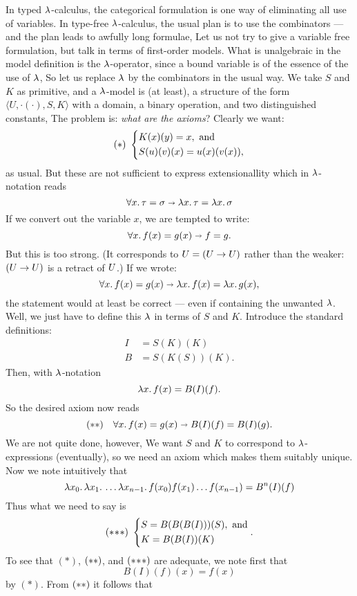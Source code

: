 In typed $\l$-calculus, the categorical formulation is one way of eliminating all use of
variables. In type-free $\l$-calculus, the usual plan is to use the combinators --- and
the plan leads to awfully long formulae, Let us not try to give a variable free
formulation, but talk in terms of first-order models. What is unalgebraic in the model
definition is the $\l$-operator, since a bound variable is of the essence of the use of
$\l$, So let us replace $\l$ by the combinators in the usual way. We take $S$ and $K$ as
primitive, and a $\l$-model is (at least), a structure of the form $\langle U,
\cdot(\cdot), S, K\rangle$ with a domain, a binary operation, and two distinguished
constants, The problem is: {\it what are the axioms}? Clearly we want:
%
\[
(*) \,\,
\begin{dcases}
K(x)(y) = x, {\textrm { and}}\\
S(u)(v)(x) = u(x)(v(x)),
\end{dcases}
\]
%
as usual. But these are not sufficient to express extensionallity which in $\l$-notation
reads
$$
\forall x.\, \tau = \sigma \imp \lm{x}. \tau = \lm{x}. \sigma
$$
If we convert out the variable $x$, we are tempted to write:
$$
\forall x.\, f(x) = g(x) \imp f = g.
$$
But this is too strong. (It corresponds to $\U = (\U \to \U)$ rather than the weaker: $(\U
\to \U)$ is a retract of $\U$.) If we wrote:
$$
\forall x.\, f(x) = g(x) \imp \lm{x}.f(x) = \lm{x}.g(x),
$$
the statement would at least be correct --- even if containing the unwanted $\l$. Well, we
just have to define this $\l$ in terms of $S$ and $K$. Introduce the standard definitions:
\begin{align*}
I &= S(K)(K)\\
B &= S(K(S))(K).
\end{align*}
%
Then, with $\l$-notation
$$
\lm{x}.f(x) = B(I)(f).
$$
So the desired axiom now reads
$$
({\mathrm {**}}) \quad \forall x.\, f(x) = g(x) \imp B(I)(f) = B(I)(g).
$$
We are not quite done, however, We want $S$ and $K$ to correspond to $\l$-expressions
(eventually), so we need an axiom which makes them suitably unique. Now we note
intuitively that
$$
\lm{x_0}. \lm{x_1}. \dots \lm{x_{n-1}}. f(x_0)f(x_1)\dots f(x_{n-1}) = B^n(I)(f)
$$
Thus what we need to say is
\[
\sss \,\,
\begin{dcases}
S = B(B(B(I)))(S), {\textrm { and}}\\
K = B(B(I))(K)
\end{dcases} .
\]
To see that $(*)$, $\ss$, and $\sss$ are adequate, we note first that
$$
B(I)(f)(x) = f(x)
$$
by $(*)$. From $\ss$ it follows that
